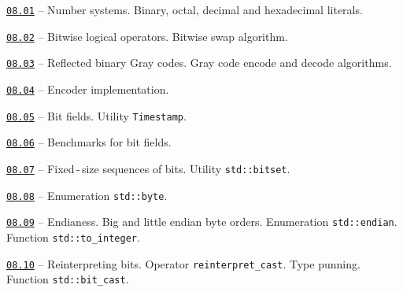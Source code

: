 \documentclass[a4paper,12pt]{article}
\renewenvironment{itemize}
{
    \begin{list}{\labelitemi}
    {
      \setlength{\topsep}{0pt}
      \setlength{\partopsep}{0pt}
      \setlength{\parskip}{0pt}
      \setlength{\itemsep}{0pt}
      \setlength{\parsep}{0pt}
      \setlength{\leftmargin}{14.5pt}
    }
}{\end{list}}
\begin{document}
\begin{itemize}

    \item \href{https://github.com/i-s-m-mipt/Education/blob/master/projects/examples/source/08.01.cpp}{\texttt{08.01}} -- Number systems. Binary, octal, decimal and hexadecimal literals.

    \smallskip

    \item \href{https://github.com/i-s-m-mipt/Education/blob/master/projects/examples/source/08.02.cpp}{\texttt{08.02}} -- Bitwise logical operators. Bitwise swap algorithm.

    \smallskip

    \item \href{https://github.com/i-s-m-mipt/Education/blob/master/projects/examples/source/08.03.cpp}{\texttt{08.03}} -- Reflected binary Gray codes. Gray code encode and decode algorithms.

    \smallskip

    \item \href{https://github.com/i-s-m-mipt/Education/blob/master/projects/examples/source/08.04.pdf}{\texttt{08.04}} -- Encoder implementation.

    \smallskip

    \item \href{https://github.com/i-s-m-mipt/Education/blob/master/projects/examples/source/08.05.cpp}{\texttt{08.05}} -- Bit fields. Utility \lstinline{Timestamp}.

    \smallskip

    \item \href{https://github.com/i-s-m-mipt/Education/blob/master/projects/examples/source/08.06.cpp}{\texttt{08.06}} -- Benchmarks for bit fields.

    \smallskip

    \item \href{https://github.com/i-s-m-mipt/Education/blob/master/projects/examples/source/08.07.cpp}{\texttt{08.07}} -- Fixed\,-\,size sequences of bits. Utility \lstinline{std::bitset}.

    \smallskip

    \item \href{https://github.com/i-s-m-mipt/Education/blob/master/projects/examples/source/08.08.cpp}{\texttt{08.08}} -- Enumeration \lstinline{std::byte}.

    \smallskip

    \item \href{https://github.com/i-s-m-mipt/Education/blob/master/projects/examples/source/08.09.cpp}{\texttt{08.09}} -- Endianess. Big and little endian byte orders. Enumeration \lstinline{std::endian}. Function \lstinline{std::to_integer}.

    \smallskip

    \item \href{https://github.com/i-s-m-mipt/Education/blob/master/projects/examples/source/08.10.cpp}{\texttt{08.10}} -- Reinterpreting bits. Operator \lstinline{reinterpret_cast}. Type punning. Function \lstinline{std::bit_cast}.

\end{itemize}
\end{document}
